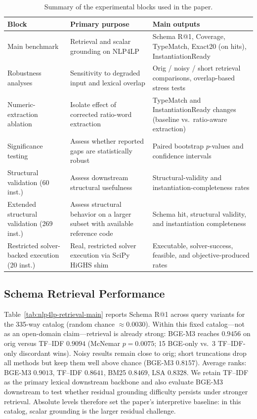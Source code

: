 \documentclass[pdflatex,sn-basic,Numbered]{sn-jnl}
\begin{document}
\begin{table}[t]
\centering
\caption{Summary of the experimental blocks used in the paper.}
\label{tab:exp_blocks}
\small
\begin{tabularx}{\linewidth}{X X X}
\toprule
Block & Primary purpose & Main outputs \\
\midrule
Main benchmark & Retrieval and scalar grounding on \textsc{NLP4LP} & Schema R@1, Coverage, TypeMatch, Exact20 (on hits), InstantiationReady \\
Robustness analyses & Sensitivity to degraded input and lexical overlap & Orig / noisy / short retrieval comparisons, overlap-based stress tests \\
Numeric-extraction ablation & Isolate effect of corrected ratio-word extraction & TypeMatch and InstantiationReady changes (baseline vs.\ ratio-aware extraction) \\
Significance testing & Assess whether reported gaps are statistically robust & Paired bootstrap $p$-values and confidence intervals \\
Structural validation (60 inst.) & Assess downstream structural usefulness & Structural-validity and instantiation-completeness rates \\
Extended structural validation (269 inst.) & Assess structural behavior on a larger subset with available reference code & Schema hit, structural validity, and instantiation completeness \\
Restricted solver-backed execution (20 inst.) & Real, restricted solver execution via SciPy HiGHS shim & Executable, solver-success, feasible, and objective-produced rates \\
\bottomrule
\end{tabularx}
\end{table}

\subsection{Schema Retrieval Performance}
\label{subsec:exp_retrieval}

Table~\ref{tab:nlp4lp-retrieval-main} reports Schema R@1 across query variants for the 335-way catalog (random chance $\approx 0.0030$). Within this fixed catalog---not as an open-domain claim---retrieval is already strong: BGE-M3 reaches $0.9456$ on orig versus TF--IDF $0.9094$ (McNemar $p=0.0075$; 15 BGE-only vs.\ 3 TF--IDF-only discordant wins). Noisy results remain close to orig; short truncations drop all methods but keep them well above chance (BGE-M3 $0.8157$). Average ranks: BGE-M3 $0.9013$, TF--IDF $0.8641$, BM25 $0.8469$, LSA $0.8328$. We retain TF--IDF as the primary lexical downstream backbone and also evaluate BGE-M3 downstream to test whether residual grounding difficulty persists under stronger retrieval. Absolute levels therefore set the paper's interpretive baseline: in this catalog, scalar grounding is the larger residual challenge.
\end{document}
